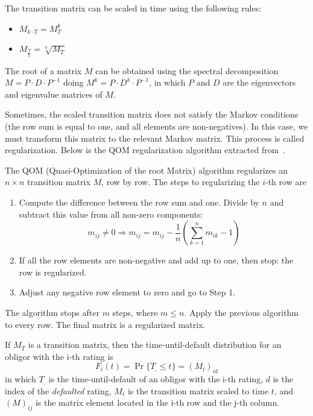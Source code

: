 \documentclass[11pt,fleqn]{book} %
\begin{document}
\begin{proposition}
	The transition matrix can be scaled in time using the following rules:
	\begin{itemize}
		\item $M_{k \cdot T} = M_{T}^k$
		\item $M_{\frac{T}{k}} = \sqrt[k]{M_{T}}$
	\end{itemize}
\end{proposition}

The root of a matrix $M$ can be obtained using the spectral decomposition
$M = P \cdot D \cdot P^{-1}$ doing $M^{k} = P \cdot D^{k} \cdot P^{-1}$, 
in which $P$ and $D$ are the eigenvectors and eigenvalue matrices of $M$. 

Sometimes, the scaled transition matrix does not satisfy the Markov conditions
(the row sum is equal to one, and all elements are non-negatives). In this case, 
we must transform this matrix to the relevant Markov matrix. This process is 
called regularization. Below is the QOM regularization algorithm extracted 
from~\cite{kreinin:2001}.

\begin{algorithm}
	The QOM (Quasi-Optimization of the root Matrix) algorithm regularizes an 
	$n {\times} n$ transition matrix $M$, row by row. The steps to 
	regularizing the $i$-th row are
	\begin{enumerate}
		\item Compute the difference between the row sum and one. 
		Divide by $n$ and subtract this value from all non-zero components:
		\begin{displaymath}
			m_{ij} \ne 0 
			\Longrightarrow 
			m_{ij} = m_{ij} - \frac{1}{n} \left( \sum_{k=1}^{n} m_{ik} - 1\right)
		\end{displaymath}
		\item If all the row elements are non-negative and add up to one, 
		then stop: the row is regularized.
		\item Adjust any negative row element to zero and go to Step 1.
	\end{enumerate}
	The algorithm stops after $m$ steps, where $m \le n$. 
	Apply the previous algorithm to every row.
	The final matrix is a regularized matrix. 
\end{algorithm}

\begin{proposition}
	\label{prop:pdftm}
	If $M_T$ is a transition matrix, then the time-until-default distribution 
	for an obligor with the i-th rating is
	\begin{displaymath}
		F_i(t) = \Pr\{T_. \le t\} = \left( M_t \right)_{id}
	\end{displaymath}
	in which $T_.$ is the time-until-default of an obligor with the i-th rating, 
	$d$ is the index of the \emph{defaulted} rating, $M_t$ is the transition 
	matrix scaled to time $t$, and $(M)_{ij}$ is the matrix element located in 
	the i-th row and the j-th column.
\end{proposition}
\end{document}
